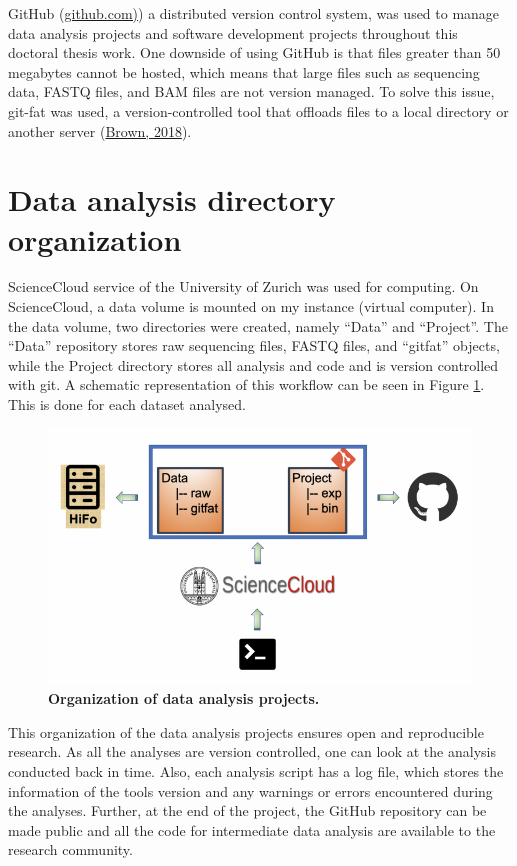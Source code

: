 \documentclass[12pt,twoside]{reedthesis}
\begin{document}
GitHub (\href{https://github.com}{github.com)}) a distributed
version control system, was used to manage data analysis projects and
software development projects throughout this doctoral thesis work. One
downside of using GitHub is that files greater than 50 megabytes cannot
be hosted, which means that large files such as sequencing data, FASTQ
files, and BAM files are not version managed. To solve this issue,
git-fat was used, a version-controlled tool that offloads files to a
local directory or another server (\protect\hyperlink{ref-brown2018}{Brown, 2018}).

\hypertarget{m2}{%
\section*{Data analysis directory organization}\label{m2}}

ScienceCloud service of the University of Zurich was used for computing.
On ScienceCloud, a data volume is mounted on my instance (virtual
computer). In the data volume, two directories were created, namely
``Data'' and ``Project''. The ``Data'' repository stores raw sequencing files,
FASTQ files, and ``gitfat'' objects, while the Project directory stores
all analysis and code and is version controlled with git. A schematic
representation of this workflow can be seen in Figure \ref{fig:mf2}. This is done
for each dataset analysed.


\begin{figure}[h]

{\centering \includegraphics{thesis_files/figure-latex/mf2-1} 

}

\caption[Organization of data analysis projects]{\textbf{Organization of data analysis projects.}}\label{fig:mf2}
\end{figure}
This organization of the data analysis projects ensures open and
reproducible research. As all the analyses are version controlled, one
can look at the analysis conducted back in time. Also, each analysis
script has a log file, which stores the information of the tools version
and any warnings or errors encountered during the analyses. Further, at
the end of the project, the GitHub repository can be made public and all
the code for intermediate data analysis are available to the research
community.
\end{document}
